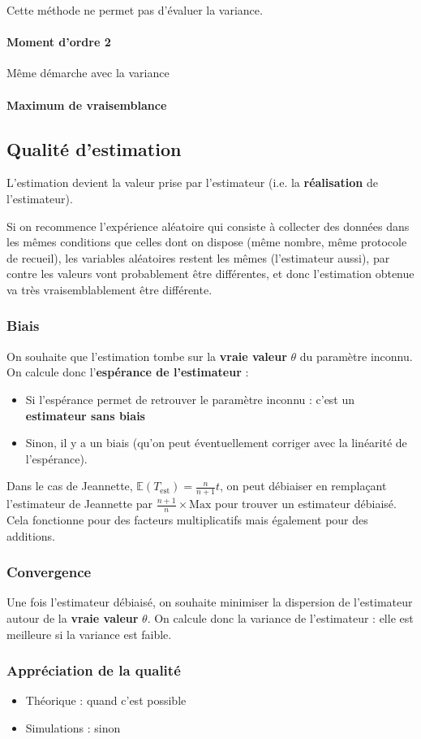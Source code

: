 \documentclass[11pt]{article}
\begin{document}
Cette méthode ne permet pas d'évaluer la variance.

\paragraph{Moment d'ordre 2} Même démarche avec la variance

\paragraph{Maximum de vraisemblance}

\subsection{Qualité d'estimation}
L'estimation devient la valeur prise par l'estimateur (i.e. la \textbf{réalisation} de l'estimateur).

Si on recommence l'expérience aléatoire qui consiste à collecter des données dans les mêmes conditions que celles dont on dispose (même nombre, même protocole de recueil), les variables aléatoires restent les mêmes (l'estimateur aussi), par contre les valeurs vont probablement être différentes, et donc l'estimation obtenue va très vraisemblablement être différente.

\subsubsection{Biais}
On souhaite que l'estimation tombe sur la \textbf{vraie valeur} $\theta$ du paramètre inconnu. On calcule donc l'\textbf{espérance de l'estimateur} :
\begin{itemize}
    \item Si l'espérance permet de retrouver le paramètre inconnu : c'est un \textbf{estimateur sans biais}
    \item Sinon, il y a un biais (qu'on peut éventuellement corriger avec la linéarité de l'espérance).
\end{itemize}

Dans le cas de Jeannette, $\mathbb{E}(T_{\text{est}}) = \frac{n}{n+1}t$, on peut débiaiser en remplaçant l'estimateur de Jeannette par $\frac{n+1}{n} \times \text{Max}$ pour trouver un estimateur débiaisé. Cela fonctionne pour des facteurs multiplicatifs mais également pour des additions.

\subsubsection{Convergence}

Une fois l'estimateur débiaisé, on souhaite minimiser la dispersion de l'estimateur autour de la \textbf{vraie valeur} $\theta$. On calcule donc la variance de l'estimateur : elle est meilleure si la variance est faible.

\subsubsection{Appréciation de la qualité}
\begin{itemize}
    \item Théorique : quand c'est possible
    \item Simulations : sinon
\end{itemize}
\end{document}
